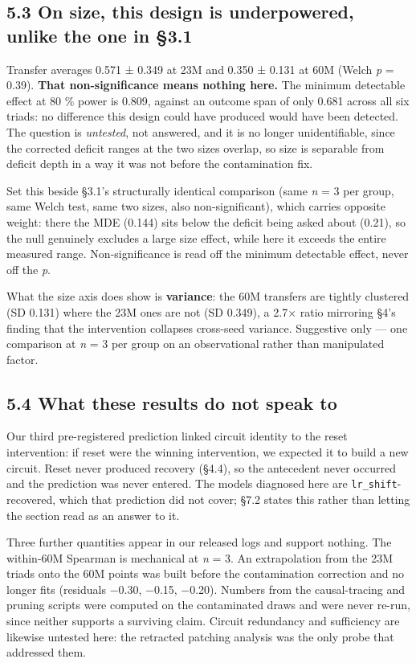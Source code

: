 \documentclass[11pt]{article}
\begin{document}
\subsection{5.3 On size, this design is underpowered, unlike the one in §3.1}\label{on-size-this-design-is-underpowered-unlike-the-one-in-3.1}

Transfer averages 0.571 ± 0.349 at 23M and 0.350 ± 0.131 at 60M (Welch \emph{p} = 0.39). \textbf{That
non-significance means nothing here.} The minimum detectable effect at 80 \% power is 0.809,
against an outcome span of only 0.681 across all six triads: no difference this design could
have produced would have been detected. The question is \emph{untested}, not answered, and it is
no longer unidentifiable, since the corrected deficit ranges at the two sizes overlap, so
size is separable from deficit depth in a way it was not before the contamination fix.

Set this beside §3.1's structurally identical comparison (same \emph{n} = 3 per group, same Welch
test, same two sizes, also non-significant), which carries opposite weight: there the MDE
(0.144) sits below the deficit being asked about (0.21), so the null genuinely excludes a
large size effect, while here it exceeds the entire measured range. Non-significance is read
off the minimum detectable effect, never off the \emph{p}.

What the size axis does show is \textbf{variance}: the 60M transfers are tightly clustered
(SD 0.131) where the 23M ones are not (SD 0.349), a 2.7× ratio mirroring §4's finding that the
intervention collapses cross-seed variance. Suggestive only — one comparison at \emph{n} = 3 per
group on an observational rather than manipulated factor.

\subsection{5.4 What these results do not speak to}\label{what-these-results-do-not-speak-to}

Our third pre-registered prediction linked circuit identity to the reset intervention: if
reset were the winning intervention, we expected it to build a new circuit. Reset never
produced recovery (§4.4), so the antecedent never occurred and the prediction was never
entered. The models diagnosed here are \texttt{lr\_shift}-recovered, which that prediction did not
cover; §7.2 states this rather than letting the section read as an answer to it.

Three further quantities appear in our released logs and support nothing. The within-60M
Spearman is mechanical at \emph{n} = 3. An extrapolation from the 23M triads onto the 60M points
was built before the contamination correction and no longer fits (residuals −0.30, −0.15,
−0.20). Numbers from the causal-tracing and pruning scripts were computed on the contaminated
draws and were never re-run, since neither supports a surviving claim. Circuit redundancy and
sufficiency are likewise untested here: the retracted patching analysis was the only probe
that addressed them.
\end{document}
